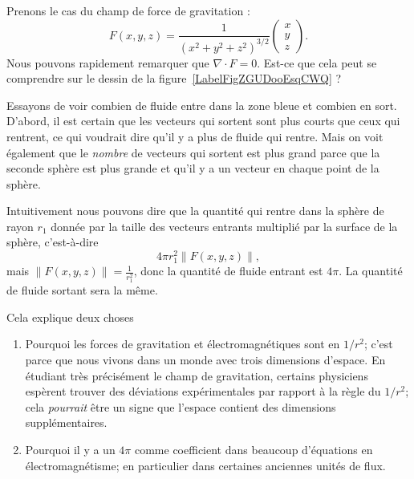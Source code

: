 \begin{example}
	Prenons le cas du champ de force de gravitation :
	\begin{equation}
		F(x,y,z)=\frac{1}{ (x^2+y^2+z^2)^{3/2} }\begin{pmatrix}
			x \\
			y \\
			z
		\end{pmatrix}.
	\end{equation}
	Nous pouvons rapidement remarquer que \( \nabla\cdot F=0\). Est-ce que cela peut se comprendre sur le dessin de la figure~\ref{LabelFigZGUDooEsqCWQ} ? %
	\newcommand{\CaptionFigZGUDooEsqCWQ}{Le champ de vecteur de la gravité. Nous avons tracé, sur les deux cercles la même densité de vecteurs, c'est-à-dire le même nombre de vecteurs par unité de surface.}
	

	Essayons de voir combien de fluide entre dans la zone bleue et combien en sort. D'abord, il est certain que les vecteurs qui sortent sont plus courts que ceux qui rentrent, ce qui voudrait dire qu'il y a plus de fluide qui rentre. Mais on voit également que le \emph{nombre} de vecteurs qui sortent est plus grand parce que la seconde sphère est plus grande et qu'il y a un vecteur en chaque point de la sphère.

	Intuitivement nous pouvons dire que la quantité qui rentre dans la sphère de rayon \( r_1\) donnée par la taille des vecteurs entrants multiplié par la surface de la sphère, c'est-à-dire
	\begin{equation}        \label{EqQpinormeVecto}
		4\pi r_1^2\| F(x,y,z) \|,
	\end{equation}
	mais \( \| F(x,y,z) \|=\frac{1}{ r_1^2 }\), donc la quantité de fluide entrant est \( 4\pi\). La quantité de fluide sortant sera la même.

	Cela explique deux choses
	\begin{enumerate}
		\item
		      Pourquoi les forces de gravitation et électromagnétiques sont en \( 1/r^2\); c'est parce que nous vivons dans un monde avec trois dimensions d'espace. En étudiant très précisément le champ de gravitation, certains physiciens espèrent trouver des déviations expérimentales par rapport à la règle du \( 1/r^2\); cela \emph{pourrait} être un signe que l'espace contient des dimensions supplémentaires.
		\item
		      Pourquoi il y a un \( 4\pi\) comme coefficient dans beaucoup d'équations en électromagnétisme; en particulier dans certaines anciennes unités de flux.
	\end{enumerate}

\end{example}

